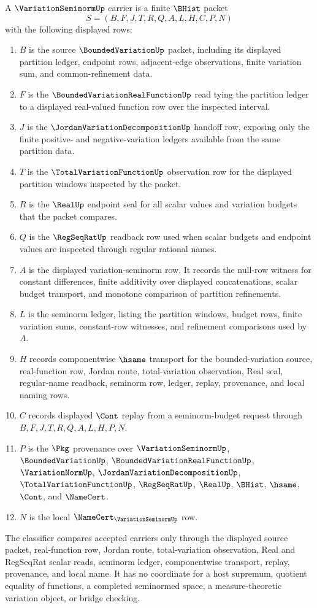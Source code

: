 \begin{definition}
\label{def:variation-seminorm-carrier}
A $\VariationSeminormUp$ carrier is a finite $\BHist$ packet
$$
S=(B,F,J,T,R,Q,A,L,H,C,P,N)
$$
with the following displayed rows:
\begin{enumerate}
\item $B$ is the source $\BoundedVariationUp$ packet, including its displayed partition ledger, endpoint rows, adjacent-edge observations, finite variation sum, and common-refinement data.
\item $F$ is the $\BoundedVariationRealFunctionUp$ read tying the partition ledger to a displayed real-valued function row over the inspected interval.
\item $J$ is the $\JordanVariationDecompositionUp$ handoff row, exposing only the finite positive- and negative-variation ledgers available from the same partition data.
\item $T$ is the $\TotalVariationFunctionUp$ observation row for the displayed partition windows inspected by the packet.
\item $R$ is the $\RealUp$ endpoint seal for all scalar values and variation budgets that the packet compares.
\item $Q$ is the $\RegSeqRatUp$ readback row used when scalar budgets and endpoint values are inspected through regular rational names.
\item $A$ is the displayed variation-seminorm row. It records the null-row witness for constant differences, finite additivity over displayed concatenations, scalar budget transport, and monotone comparison of partition refinements.
\item $L$ is the seminorm ledger, listing the partition windows, budget rows, finite variation sums, constant-row witnesses, and refinement comparisons used by $A$.
\item $H$ records componentwise $\hsame$ transport for the bounded-variation source, real-function row, Jordan route, total-variation observation, Real seal, regular-name readback, seminorm row, ledger, replay, provenance, and local naming rows.
\item $C$ records displayed $\Cont$ replay from a seminorm-budget request through $B,F,J,T,R,Q,A,L,H,P,N$.
\item $P$ is the $\Pkg$ provenance over $\VariationSeminormUp$, $\BoundedVariationUp$, $\BoundedVariationRealFunctionUp$, $\VariationNormUp$, $\JordanVariationDecompositionUp$, $\TotalVariationFunctionUp$, $\RegSeqRatUp$, $\RealUp$, $\BHist$, $\hsame$, $\Cont$, and $\NameCert$.
\item $N$ is the local $\NameCert_{\VariationSeminormUp}$ row.
\end{enumerate}
The classifier compares accepted carriers only through the displayed source packet, real-function row, Jordan route, total-variation observation, Real and RegSeqRat scalar reads, seminorm ledger, componentwise transport, replay, provenance, and local name. It has no coordinate for a host supremum, quotient equality of functions, a completed seminormed space, a measure-theoretic variation object, or bridge checking.
\end{definition}
